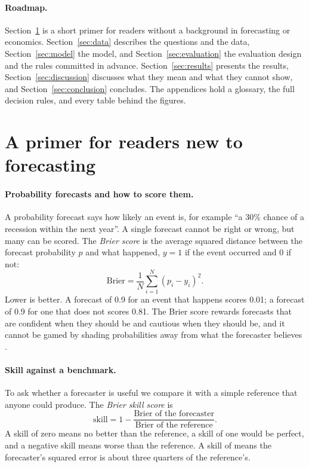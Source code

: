 \documentclass[11pt]{article}
\newcommand{\derived}[1]{#1}
\begin{document}
\paragraph{Roadmap.} Section~\ref{sec:primer} is a short primer for readers without a background in
forecasting or economics. Section~\ref{sec:data} describes the questions and the data,
Section~\ref{sec:model} the model, and Section~\ref{sec:evaluation} the evaluation design and the rules
committed in advance. Section~\ref{sec:results} presents the results, Section~\ref{sec:discussion}
discusses what they mean and what they cannot show, and Section~\ref{sec:conclusion} concludes. The
appendices hold a glossary, the full decision rules, and every table behind the figures.

\section{A primer for readers new to forecasting}\label{sec:primer}

\paragraph{Probability forecasts and how to score them.} A probability forecast says how likely an event
is, for example ``a 30\% chance of a recession within the next year''. A single forecast cannot be right
or wrong, but many can be scored. The \emph{Brier score} is the average squared distance between the
forecast probability $p$ and what happened, $y = 1$ if the event occurred and $0$ if not:
\begin{equation}
  \text{Brier} = \frac{1}{N}\sum_{i=1}^{N} (p_i - y_i)^2 .
\end{equation}
Lower is better. A forecast of \derived{0.9} for an event that happens scores \derived{0.01}; a forecast of
\derived{0.9} for one that does not scores \derived{0.81}. The Brier score rewards forecasts that are
confident when they should be and cautious when they should be, and it cannot be gamed by shading
probabilities away from what the forecaster believes \citep{gneiting2007strictly}.

\paragraph{Skill against a benchmark.} To ask whether a forecaster is useful we compare it with a simple
reference that anyone could produce. The \emph{Brier skill score} is
\begin{equation}
  \text{skill} = 1 - \frac{\text{Brier of the forecaster}}{\text{Brier of the reference}} .
\end{equation}
A skill of zero means no better than the reference, a skill of one would be perfect, and a negative skill
means worse than the reference. A skill of \BlendSkillOneYear{} means the forecaster's squared error is
about three quarters of the reference's.
\end{document}
